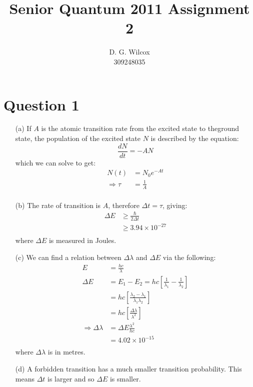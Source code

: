 \documentclass[10pt,a4paper]{article}
\title{Senior Quantum 2011 Assignment 2}
\date{}
\author{D. G. Wilcox \\
		309248035}
\begin{document}
\maketitle
\section*{Question 1}
\begin{itemize}
	\item[(a)] If $A$ is the atomic transition rate from the excited state to theground state, the population of the excited state $N$ is described by the equation:
		\begin{equation*}
			\frac{dN}{dt} = - A N
		\end{equation*}
	which we can solve to get:
		\begin{align*}
			N(t) &= N_{0}e^{-At} \\
			\Rightarrow \tau &= \frac{1}{A} \\
		\end{align*}
	
	\item[(b)] The rate of transition is $A$, therefore $\Delta t = \tau$, giving:
		\begin{align*}
			\Delta E &\geq \frac{\hbar}{2 \Delta t} \\
			&\geq 3.94 \times 10^{-27} \\
		\end{align*}
	where $\Delta E$ is measured in Joules.

	\item[(c)] We can find a relation between $\Delta \lambda$ and $\Delta E$ via the following:
		\begin{align*}
			E &= \frac{hc}{\lambda} \\
			\Delta E &= E_{1} - E_{2} = hc [\frac{1}{\lambda_{1}} - \frac{1}{\lambda_{2}}] \\
			&= hc [\frac{\lambda_{2} - \lambda_{1}}{\lambda_{1}\lambda_{2}}] \\
			&= hc [\frac{\Delta \lambda}{\lambda^{2}}] \\
			\Rightarrow \Delta \lambda &= \Delta E \frac{\lambda^{2}}{hc} \\
			&= 4.02 \times 10^{-15} \\
		\end{align*}
	where $\Delta \lambda$ is in metres.

	\item[(d)] A forbidden transition has a much smaller transition probability. This means $\Delta t$ is larger and so $\Delta E$ is smaller.
\end{itemize}
\end{document}
